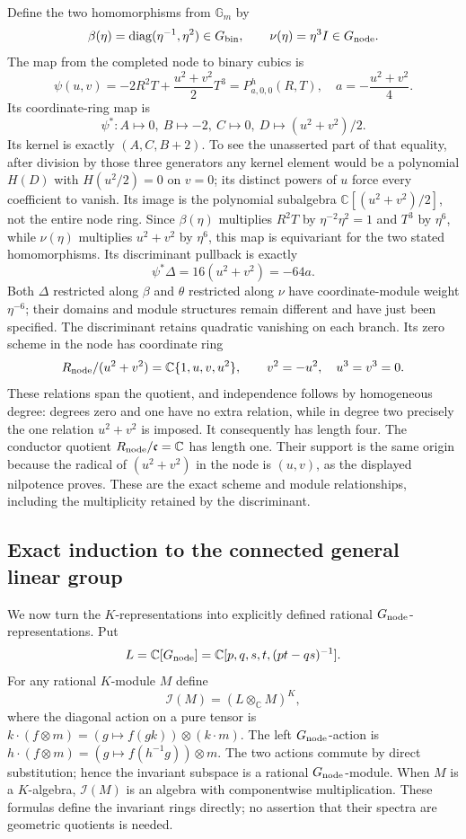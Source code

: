 Define the two homomorphisms from $\mathbb G_m$ by
\[
 \beta(\eta)=\operatorname{diag}(\eta^{-1},\eta^2)\in G_{\rm bin},
 \qquad
 \nu(\eta)=\eta^3 I\in G_{\rm node}.
\]
The map from the completed node to binary cubics is
\begin{equation}\label{eq:invariant-node-to-cubic}
 \psi(u,v)=-2R^2T+\frac{u^2+v^2}{2}T^3
          =P^h_{a,0,0}(R,T),\quad a=-\frac{u^2+v^2}{4}.
\end{equation}
Its coordinate-ring map is
\[
 \psi^*: A\mapsto0,\ B\mapsto-2,\ C\mapsto0,
 \ D\mapsto(u^2+v^2)/2.
\]
Its kernel is exactly $(A,C,B+2)$. To see the unasserted part of
that equality, after division by those three generators any kernel
element would be a polynomial $H(D)$ with $H(u^2/2)=0$ on $v=0$;
its distinct powers of $u$ force every coefficient to vanish.
Its image is the polynomial subalgebra
$\mathbb C[(u^2+v^2)/2]$, not the entire node ring.
Since $\beta(\eta)$ multiplies $R^2T$ by
$\eta^{-2}\eta^2=1$ and $T^3$ by $\eta^6$, while $\nu(\eta)$
multiplies $u^2+v^2$ by $\eta^6$, this map is equivariant for the
two stated homomorphisms. Its discriminant pullback is exactly
\begin{equation}\label{eq:invariant-disc-node}
 \psi^*\Delta=16(u^2+v^2)=-64a.
\end{equation}
Both $\Delta$ restricted along $\beta$ and $\theta$ restricted along
$\nu$ have coordinate-module weight $\eta^{-6}$; their domains and
module structures remain different and have just been specified.
The discriminant retains quadratic vanishing on each branch. Its
zero scheme in the node has coordinate ring
\[
 R_{\rm node}/(u^2+v^2)
 =\mathbb C\{1,u,v,u^2\},\qquad
 v^2=-u^2,\quad u^3=v^3=0.
\]
These relations span the quotient, and independence follows by
homogeneous degree: degrees zero and one have no extra relation,
while in degree two precisely the one relation $u^2+v^2$ is imposed.
It consequently has length four. The conductor quotient
$R_{\rm node}/\mathfrak c=\mathbb C$ has length one. Their support
is the same origin because the radical of $(u^2+v^2)$ in the node
is $(u,v)$, as the displayed nilpotence proves. These are the exact
scheme and module relationships, including the multiplicity retained
by the discriminant.

\subsection{Exact induction to the connected general linear group}

We now turn the $K$-representations into explicitly defined rational
$G_{\rm node}$-representations. Put
\[
 L=\mathbb C[G_{\rm node}]
   =\mathbb C[p,q,s,t,(pt-qs)^{-1}].
\]
For any rational $K$-module $M$ define
\[
 \mathcal I(M)=(L\otimes_{\mathbb C}M)^K,
\]
where the diagonal action on a pure tensor is
$k\cdot(f\otimes m)=(g\mapsto f(gk))\otimes(k\cdot m)$.
The left $G_{\rm node}$-action is
$h\cdot(f\otimes m)=(g\mapsto f(h^{-1}g))\otimes m$.
The two actions commute by direct substitution; hence the invariant
subspace is a rational $G_{\rm node}$-module. When $M$ is a
$K$-algebra, $\mathcal I(M)$ is an algebra with componentwise
multiplication. These formulas define the invariant rings directly;
no assertion that their spectra are geometric quotients is needed.

